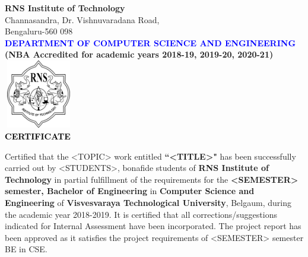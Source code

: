 \thispagestyle{empty}
\begin{center}

\textup{\large {\textcolor{darkbrown}{\bf RNS Institute of Technology}} \\ 
\normalsize{\textcolor{darkbrown}{Channasandra, Dr. Vishnuvaradana Road,\\ Bengaluru-560 098}}}\\[0.1in]
\textup{\normalsize {\textcolor{blue}{\bf DEPARTMENT OF COMPUTER SCIENCE AND ENGINEERING}}}\\ \textup{\small \bf \textcolor{darkbrown}{(NBA Accredited for academic years 2018-19, 2019-20, 2020-21)}} \\[0.1in]
\includegraphics[width=3cm, height=3cm]{../static/media/RNS_logo.png}\\[0.1in]
\textup{\large {\textcolor{black}{\textbf {CERTIFICATE}}}} \\[0.1in]
\end{center}

\begin{minipage}{14.8cm}
Certified that the <TOPIC> work entitled \textbf{``<TITLE>"} has been successfully carried out by <STUDENTS>, bonafide students of \textbf{RNS Institute of Technology} in partial fulfillment of the requirements for the \textbf{<SEMESTER> semester, Bachelor of Engineering} in \textbf{Computer Science and Engineering} of \textbf{Visvesvaraya Technological University}, Belgaum, during the academic year 2018-2019. It is certified that all corrections/suggestions indicated for Internal Assessment have been incorporated. The project report has been approved as it satisfies the project requirements of <SEMESTER> semester BE in CSE.\\[0.4in]
\end{minipage}

